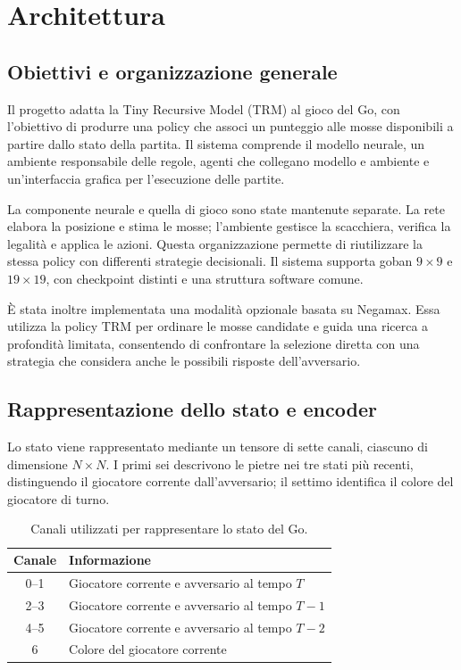 \section{Architettura}

\subsection{Obiettivi e organizzazione generale}

Il progetto adatta la Tiny Recursive Model (TRM) al gioco del Go, con l'obiettivo di produrre una policy che associ un punteggio alle mosse disponibili a partire dallo stato della partita. Il sistema comprende il modello neurale, un ambiente responsabile delle regole, agenti che collegano modello e ambiente e un'interfaccia grafica per l'esecuzione delle partite.

La componente neurale e quella di gioco sono state mantenute separate. La rete elabora la posizione e stima le mosse; l'ambiente gestisce la scacchiera, verifica la legalità e applica le azioni. Questa organizzazione permette di riutilizzare la stessa policy con differenti strategie decisionali. Il sistema supporta goban $9\times9$ e $19\times19$, con checkpoint distinti e una struttura software comune.

È stata inoltre implementata una modalità opzionale basata su Negamax. Essa utilizza la policy TRM per ordinare le mosse candidate e guida una ricerca a profondità limitata, consentendo di confrontare la selezione diretta con una strategia che considera anche le possibili risposte dell'avversario.

\subsection{Rappresentazione dello stato e encoder}

Lo stato viene rappresentato mediante un tensore di sette canali, ciascuno di dimensione $N\times N$. I primi sei descrivono le pietre nei tre stati più recenti, distinguendo il giocatore corrente dall'avversario; il settimo identifica il colore del giocatore di turno.

\begin{table}[htbp]
    \centering
    \caption{Canali utilizzati per rappresentare lo stato del Go.}
    \label{tab:go_input_channels}
    \begin{tabular}{cl}
        \hline
        \textbf{Canale} & \textbf{Informazione} \\
        \hline
        0--1 & Giocatore corrente e avversario al tempo $T$ \\
        2--3 & Giocatore corrente e avversario al tempo $T-1$ \\
        4--5 & Giocatore corrente e avversario al tempo $T-2$ \\
        6 & Colore del giocatore corrente \\
        \hline
    \end{tabular}
\end{table}

